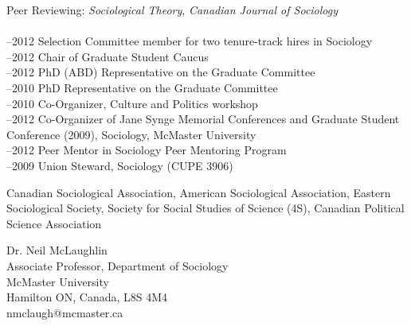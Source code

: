 \documentclass[11pt,usenames,dvipsnames]{article}
\begin{document}


\noindent Peer Reviewing: {\it Sociological Theory}, {\it Canadian Journal of Sociology}\\

\\
–2012 Selection Committee member for two tenure-track hires in Sociology\\
–2012 Chair of Graduate Student Caucus\\
–2012 PhD (ABD) Representative on the Graduate Committee\\
–2010 PhD Representative on the Graduate Committee\\
–2010 Co-Organizer, Culture and Politics workshop\\
–2012 Co-Organizer of Jane Synge Memorial Conferences and Graduate Student Conference (2009), Sociology, McMaster University\\
–2012 Peer Mentor in Sociology Peer Mentoring Program\\
–2009 Union Steward, Sociology (CUPE 3906)\\



\noindent Canadian Sociological Association, American Sociological Association, Eastern Sociological Society, Society for Social Studies of Science (4S), Canadian Political Science Association\\



\noindent Dr. Neil McLaughlin\\
Associate Professor, Department of Sociology\\
McMaster University\\
Hamilton ON, Canada, L8S 4M4\\
nmclaugh@mcmaster.ca\\
\end{document}
